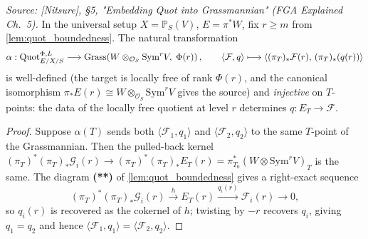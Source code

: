 \begin{lemma}
  \label{lem:quot_alpha_injective}

  \textit{Source: [Nitsure], \S 5, "Embedding Quot into Grassmannian"
  (FGA Explained Ch.~5).}
  In the universal setup \(X = \mathbb{P}_S(V)\), \(E = \pi^* W\), fix
  \(r \ge m\) from \cref{lem:quot_boundedness}. The natural transformation
  \[
    \alpha :
    \operatorname{Quot}^{\Phi,L}_{E/X/S} \longrightarrow
    \mathrm{Grass}\!\left(
      W \otimes_{\mathcal{O}_S} \mathrm{Sym}^r V,\; \Phi(r)
    \right),
    \qquad
    \langle \mathcal{F}, q\rangle \longmapsto
    \langle (\pi_T)_*\mathcal{F}(r),\, (\pi_T)_*(q(r))\rangle
  \]
  is well-defined (the target is locally free of rank \(\Phi(r)\), and the
  canonical isomorphism \(\pi_* E(r) \cong W \otimes_{\mathcal{O}_S}
  \mathrm{Sym}^r V\) gives the source) and \emph{injective} on \(T\)-points:
  the data of the locally free quotient at level \(r\) determines
  \(q : E_T \to \mathcal{F}\).
\end{lemma}

\begin{proof}
  
  Suppose \(\alpha(T)\) sends both \(\langle \mathcal{F}_1, q_1\rangle\) and
  \(\langle \mathcal{F}_2, q_2\rangle\) to the same \(T\)-point of the
  Grassmannian. Then the pulled-back kernel
  \((\pi_T)^* (\pi_T)_* \mathcal{G}_i(r) \to (\pi_T)^* (\pi_T)_* E_T(r)
  = \pi_{T_0}^* (W \otimes \mathrm{Sym}^r V)_T\)
  is the same. The diagram \textbf{(**)} of
  \cref{lem:quot_boundedness} gives a right-exact sequence
  \[
    (\pi_T)^* (\pi_T)_* \mathcal{G}_i(r) \xrightarrow{h}
    E_T(r) \xrightarrow{q_i(r)} \mathcal{F}_i(r) \to 0,
  \]
  so \(q_i(r)\) is recovered as the cokernel of \(h\); twisting by \(-r\)
  recovers \(q_i\), giving \(q_1 = q_2\) and hence
  \(\langle \mathcal{F}_1, q_1\rangle = \langle \mathcal{F}_2, q_2\rangle\).
\end{proof}

